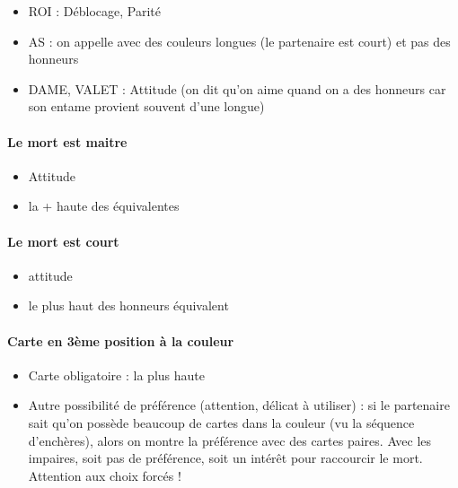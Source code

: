 \documentclass[a4paper]{article}
\begin{document}
\begin{itemize}
\item ROI : Déblocage, Parité

\item AS : on appelle avec des couleurs longues (le partenaire est court) et pas des honneurs

\item DAME, VALET : Attitude (on dit qu’on aime quand on a des honneurs car son entame provient souvent d’une longue)

\end{itemize}

\paragraph{Le mort est maitre}

\begin{itemize}
\item Attitude

\item la + haute des équivalentes

\end{itemize}

\paragraph{Le mort est court}

\begin{itemize}
\item attitude

\item le plus haut des honneurs équivalent

\end{itemize}

\paragraph{Carte en 3ème position à la couleur}

\begin{itemize}
\item Carte obligatoire : la plus haute

\item Autre possibilité de préférence (attention, délicat à utiliser) : si le partenaire sait qu’on possède beaucoup de cartes dans la couleur (vu la séquence d’enchères), alors on montre la préférence avec des cartes paires. Avec les impaires, soit pas de préférence, soit un intérêt pour raccourcir le mort. Attention aux choix forcés !

\end{itemize}
\end{document}
